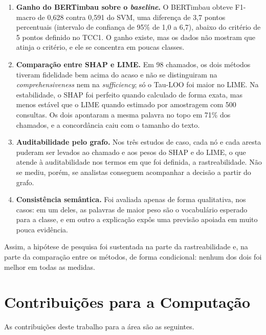 \documentclass[
    12pt,                %
    openright,           %
    oneside,             %
    a4paper,             %
    english,             %
    brazil               %
]{abntex2}
\begin{document}
\begin{enumerate}
    \item \textbf{Ganho do BERTimbau sobre o \textit{baseline}.} O BERTimbau obteve F1-macro de 0,628 contra 0,591 do SVM, uma diferença de 3,7 pontos percentuais (intervalo de confiança de 95\% de 1,0 a 6,7), abaixo do critério de 5 pontos definido no TCC1. O ganho existe, mas os dados não mostram que atinja o critério, e ele se concentra em poucas classes.

    \item \textbf{Comparação entre SHAP e LIME.} Em 98 chamados, os dois métodos tiveram fidelidade bem acima do acaso e não se distinguiram na \textit{comprehensiveness} nem na \textit{sufficiency}; só o Tau-LOO foi maior no LIME. Na estabilidade, o SHAP foi perfeito quando calculado de forma exata, mas menos estável que o LIME quando estimado por amostragem com 500 consultas. Os dois apontaram a mesma palavra no topo em 71\% dos chamados, e a concordância caiu com o tamanho do texto.

    \item \textbf{Auditabilidade pelo grafo.} Nos três estudos de caso, cada nó e cada aresta puderam ser levados ao chamado e aos pesos do SHAP e do LIME, o que atende à auditabilidade nos termos em que foi definida, a rastreabilidade. Não se mediu, porém, se analistas conseguem acompanhar a decisão a partir do grafo.

    \item \textbf{Consistência semântica.} Foi avaliada apenas de forma qualitativa, nos casos: em um deles, as palavras de maior peso são o vocabulário esperado para a classe, e em outro a explicação expôs uma previsão apoiada em muito pouca evidência.
\end{enumerate}

Assim, a hipótese de pesquisa foi sustentada na parte da rastreabilidade e, na parte da comparação entre os métodos, de forma condicional: nenhum dos dois foi melhor em todas as medidas.

\section{Contribuições para a Computação}
As contribuições deste trabalho para a área são as seguintes.
 
\end{document}
